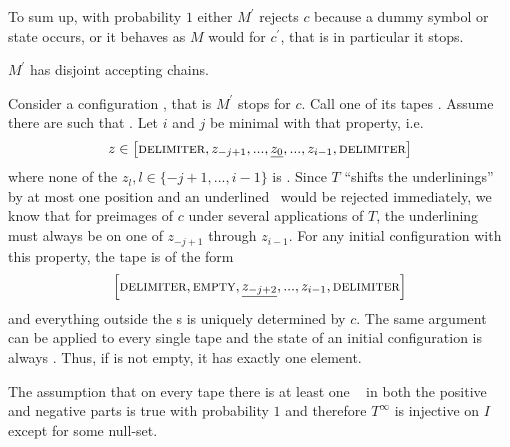 	To sum up, with probability $1$ either $M^\prime$ rejects $c$ because a dummy symbol or state occurs, or it behaves as $M$ would for $c^\prime$, that is in particular it stops.
\endproof

\begin{Lemma}
	\label{tm_to_tds:properties:lemma_disjoint_accepting_chains}
	$M^\prime$ has disjoint accepting chains.
\end{Lemma}
\proof
Consider a configuration , that is $M^\prime$ stops for $c$. Call one of its tapes .
Assume there are  such that .
Let $i$ and $j$ be minimal with that property, i.e.
\begin{align*}
	z \in \left [ \text{\scshape{delimiter}} , z_{-j+1} , ... , \underline{z_0} , ... , z_{i-1} , \text{\scshape{delimiter}} \right ]
\end{align*}
where none of the $z_l, l \in \{-j+1,...,i-1\}$ is \DELIM.
Since $T$ ``shifts the underlinings'' by at most one position and an underlined \DELIM~would be rejected immediately, we know that for preimages of $c$ under several applications of $T$, the underlining must always be on one of $z_{-j+1}$ through $z_{i-1}$. For any initial configuration with this property, the tape is of the form
\begin{align*}
	\left [ \text{\scshape{delimiter}} , \text{\scshape{empty}} , \underline{z_{-j+2}} , ... , z_{i-1} , \text{\scshape{delimiter}} \right ]
\end{align*}
and everything outside the \DELIM s is uniquely determined by $c$.
The same argument can be applied to every single tape and the state of an initial configuration is always \INI.
Thus, if  is not empty, it has exactly one element.

The assumption that on every tape there is at least one \DELIM~ in both the positive and negative parts is true with probability $1$ and therefore $T^\infty$ is injective on $I$ except for some null-set.
\endproof
